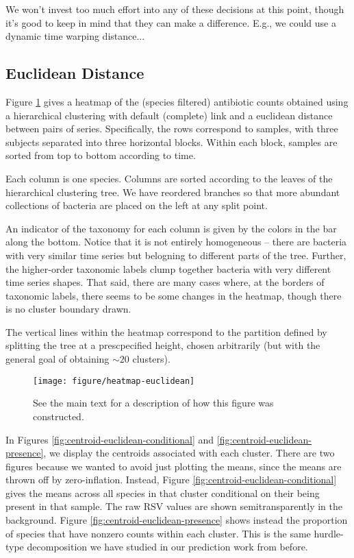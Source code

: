\documentclass{article}
\begin{document}
We won't invest too much effort into any of these decisions at this point,
though it's good to keep in mind that they can make a difference. E.g., we could
use a dynamic time warping distance...

\subsection{Euclidean Distance}

Figure \ref{fig:heatmap-euclidean} gives a heatmap of the (species filtered)
antibiotic counts obtained using a hierarchical clustering with default
(complete) link and a euclidean distance between pairs of series. Specifically,
the rows correspond to samples, with three subjects separated into three
horizontal blocks. Within each block, samples are sorted from top to bottom
according to time.

Each column is one species. Columns are sorted according to the leaves of the
hierarchical clustering tree. We have reordered branches so that more abundant
collections of bacteria are placed on the left at any split point.

An indicator of the taxonomy for each column is given by the colors in the bar
along the bottom. Notice that it is not entirely homogeneous -- there are
bacteria with very similar time series but belogning to different parts of the
tree. Further, the higher-order taxonomic labels clump together bacteria with
very different time series shapes. That said, there are many cases where, at the
borders of taxonomic labels, there seems to be some changes in the heatmap,
though there is no cluster boundary drawn.

The vertical lines within the heatmap correspond to the partition defined by
splitting the tree at a prescpecified height, chosen arbitrarily (but with the
general goal of obtaining $\sim 20$ clusters).

\begin{figure}[ht]
  \centering
  \texttt{[image: figure/heatmap-euclidean]}
  \caption{See the main text for a description of how this figure was
    constructed.\label{fig:heatmap-euclidean} }
\end{figure}

In Figures \ref{fig:centroid-euclidean-conditional} and
\ref{fig:centroid-euclidean-presence}, we display the centroids associated with
each cluster. There are two figures because we wanted to avoid just plotting the
means, since the means are thrown off by zero-inflation. Instead, Figure
\ref{fig:centroid-euclidean-conditional} gives the means across all species in
that cluster conditional on their being present in that sample. The raw RSV
values are shown semitransparently in the background. Figure
\ref{fig:centroid-euclidean-presence} shows instead the proportion of species
that have nonzero counts within each cluster. This is the same hurdle-type
decomposition we have studied in our prediction work from before.
\end{document}
